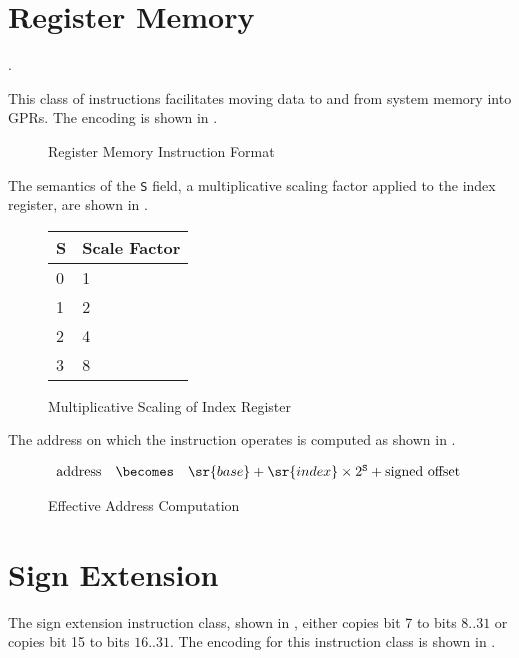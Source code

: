 \section{Register Memory}\label{sect:register-memory}.

This class of instructions facilitates moving data to and from system
memory into \acp{GPR}.  The encoding is shown in
.

\begin{figure}[H]
  \centering
    \usebox{\regmemtypebox}
    \caption{Register Memory Instruction Format}
    \label{fig:register-memory-format}
\end{figure}

The semantics of the \texttt{S} field, a multiplicative scaling factor
applied to the index register, are shown in
.

\begin{figure}[H]
  \centering
  \begin{tabular}{l|l}
    S &  Scale Factor\\
    \hline
    0 & 1 \\
    1 & 2 \\
    2 & 4 \\
    3 & 8
  \end{tabular}
  \caption{Multiplicative Scaling of Index Register}
  \label{fig:register-memory-scale}
\end{figure}

The address on which the instruction operates is computed as shown
 in .

\begin{figure}[H]
  \centering
    \begin{math}
      \begin{array}{lcl}
        \textrm{address} & \becomes & \sr{base} + \sr{index} \times 2^{\texttt{S}} + \textrm{signed offset} \\
      \end{array}
    \end{math}
  \caption{Effective Address Computation}\label{fig:register-memory-address}
\end{figure}


\section{Sign Extension}

The sign extension instruction class, shown in
, either copies bit 7 to bits ${8..31}$ or
copies bit 15 to bits ${16..31}$.  The encoding for this instruction
class is shown in .

